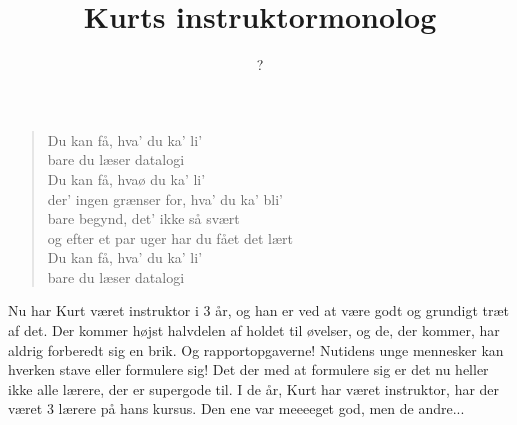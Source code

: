 \documentclass[a4paper,11pt]{article}
\title{Kurts instruktormonolog}
\author{?}
\begin{document}
\maketitle
\begin{sketch}
\begin{quote}
    Du kan få, hva' du ka' li' \\
    bare du læser datalogi \\
    Du kan få, hvaø du ka' li' \\
    der' ingen grænser for, hva' du ka' bli' \\
    bare begynd, det' ikke så svært \\
    og efter et par uger har du fået det lært \\
    Du kan få, hva' du ka' li' \\
    bare du læser datalogi 
\end{quote}

Nu har Kurt været instruktor i 3 år, og han er ved at være godt og grundigt træt af det. Der kommer højst halvdelen af holdet til øvelser, og de, der kommer, har aldrig forberedt sig en brik. Og rapportopgaverne! Nutidens unge mennesker kan hverken stave eller formulere sig! Det der med at formulere sig er det nu heller ikke alle lærere, der er supergode til. I de år, Kurt har været instruktor, har der været 3 lærere på hans kursus. Den ene var meeeeget god, men de andre...

\end{sketch}
\end{document}
